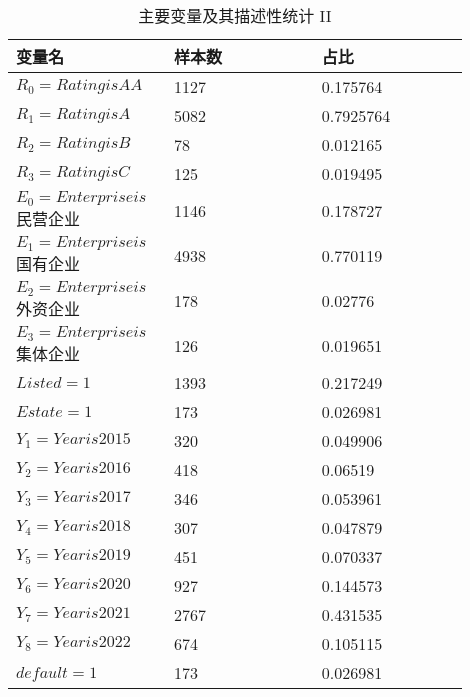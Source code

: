 \begin{table}[ht]
	\caption{主要变量及其描述性统计 II }
	\label{virtual}
	\begin{tabular}{p{0.3\linewidth}p{0.3\linewidth}p{0.3\linewidth}}
		\toprule
		\textbf{变量名}              & \textbf{样本数} & \textbf{占比} \\ \midrule
		\(R_0=Rating is AA\)      & 1127         & 0.175764    \\
		\(R_1=Rating is A\)       & 5082         & 0.7925764   \\
		\(R_2=Rating is B\)       & 78           & 0.012165    \\
		\(R_3=Rating is C\)       & 125          & 0.019495    \\
		\(E_0=Enterprise is\)民营企业 & 1146         & 0.178727    \\
		\(E_1=Enterprise is\)国有企业 & 4938         & 0.770119    \\
		\(E_2=Enterprise is\)外资企业 & 178          & 0.02776     \\
		\(E_3=Enterprise is\)集体企业 & 126          & 0.019651    \\
		\(Listed=1\)              & 1393         & 0.217249    \\
		\(Estate=1\)              & 173          & 0.026981    \\
		\(Y_1=Year is 2015\)      & 320          & 0.049906    \\
		\(Y_2=Year is 2016\)      & 418          & 0.06519     \\
		\(Y_3=Year is 2017\)      & 346          & 0.053961    \\
		\(Y_4=Year is 2018\)      & 307          & 0.047879    \\
		\(Y_5=Year is 2019\)      & 451          & 0.070337    \\
		\(Y_6=Year is 2020\)      & 927          & 0.144573    \\
		\(Y_7=Year is 2021\)      & 2767         & 0.431535    \\
		\(Y_8=Year is 2022\)      & 674          & 0.105115    \\
		\(default=1\)             & 173          & 0.026981    \\
		\bottomrule
	\end{tabular}\\
\end{table}
